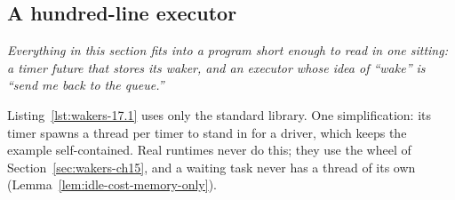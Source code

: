
\subsection{A hundred-line executor}
\label{sec:wakers-ch17}

\textit{Everything in this section fits into a program short enough to read in one sitting: a timer future that stores its waker, and an executor whose idea of ``wake'' is ``send me back to the queue.''}

Listing~\ref{lst:wakers-17.1} uses only the standard library. One simplification: its timer spawns a thread per timer to stand in for a driver, which keeps the example self-contained. Real runtimes never do this; they use the wheel of Section~\ref{sec:wakers-ch15}, and a waiting task never has a thread of its own (Lemma~\ref{lem:idle-cost-memory-only}).

